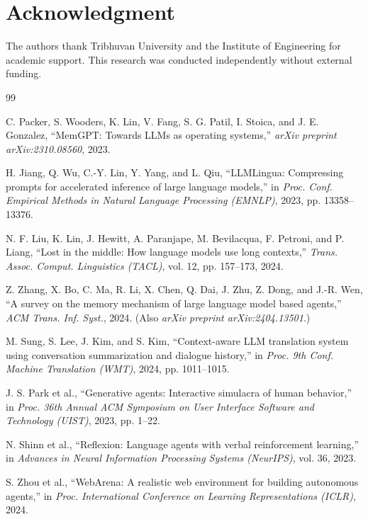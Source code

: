 \documentclass[conference]{IEEEtran}
\begin{document}
\section*{Acknowledgment}

The authors thank Tribhuvan University and the Institute of Engineering for academic support. This research was conducted independently without external funding.

\begin{thebibliography}{99}

C. Packer, S. Wooders, K. Lin, V. Fang, S. G. Patil, I. Stoica, and J. E. Gonzalez, ``MemGPT: Towards LLMs as operating systems,'' \textit{arXiv preprint arXiv:2310.08560}, 2023.

H. Jiang, Q. Wu, C.-Y. Lin, Y. Yang, and L. Qiu, ``LLMLingua: Compressing prompts for accelerated inference of large language models,'' in \textit{Proc. Conf. Empirical Methods in Natural Language Processing (EMNLP)}, 2023, pp. 13358--13376.

N. F. Liu, K. Lin, J. Hewitt, A. Paranjape, M. Bevilacqua, F. Petroni, and P. Liang, ``Lost in the middle: How language models use long contexts,'' \textit{Trans. Assoc. Comput. Linguistics (TACL)}, vol. 12, pp. 157--173, 2024.

Z. Zhang, X. Bo, C. Ma, R. Li, X. Chen, Q. Dai, J. Zhu, Z. Dong, and J.-R. Wen, ``A survey on the memory mechanism of large language model based agents,'' \textit{ACM Trans. Inf. Syst.}, 2024. (Also \textit{arXiv preprint arXiv:2404.13501}.)

M. Sung, S. Lee, J. Kim, and S. Kim, ``Context-aware LLM translation system using conversation summarization and dialogue history,'' in \textit{Proc. 9th Conf. Machine Translation (WMT)}, 2024, pp. 1011--1015.

J. S. Park et al., ``Generative agents: Interactive simulacra of human behavior,'' in \textit{Proc. 36th Annual ACM Symposium on User Interface Software and Technology (UIST)}, 2023, pp. 1--22.

N. Shinn et al., ``Reflexion: Language agents with verbal reinforcement learning,'' in \textit{Advances in Neural Information Processing Systems (NeurIPS)}, vol. 36, 2023.

S. Zhou et al., ``WebArena: A realistic web environment for building autonomous agents,'' in \textit{Proc. International Conference on Learning Representations (ICLR)}, 2024.


\end{thebibliography}
\end{document}
